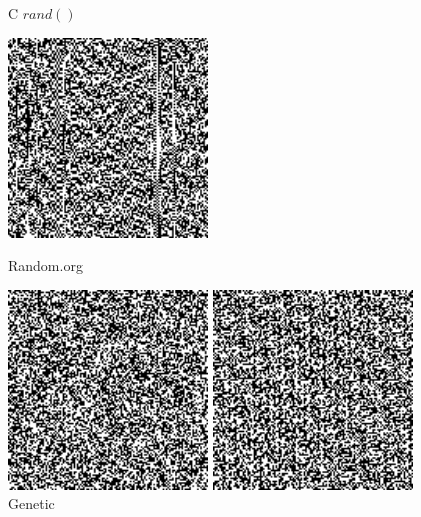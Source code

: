\documentclass[a4paper,10.5pt]{article}
\begin{document}
\begin{figure}[H]
\begin{minipage}{.35\textwidth}
\caption{C $rand()$}
\includegraphics[keepaspectratio=true, height= 150pt]{crand.png}
\end{minipage}%
\begin{minipage}{.35\textwidth}
\caption{Random.org}
\includegraphics[keepaspectratio=true, height= 150pt]{randomorg.png}
\end{minipage}%
\begin{minipage}{.35\textwidth}
\caption{Genetic}
\includegraphics[keepaspectratio=true, height= 150pt]{myrand.png}
\end{minipage}%
\end{figure}
\end{document}
